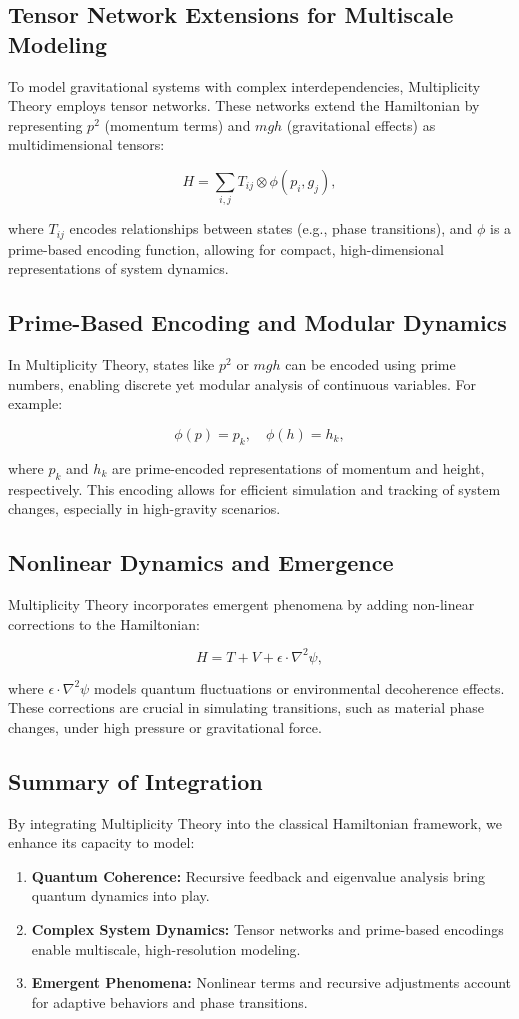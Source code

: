 \documentclass{article}
\theoremstyle{plain}
\begin{document}
\subsection{Tensor Network Extensions for Multiscale Modeling}
To model gravitational systems with complex interdependencies, Multiplicity Theory employs tensor networks. These networks extend the Hamiltonian by representing \( p^2 \) (momentum terms) and \( mgh \) (gravitational effects) as multidimensional tensors:

\[
H = \sum_{i,j} T_{ij} \otimes \phi(p_i, g_j),
\]

where \( T_{ij} \) encodes relationships between states (e.g., phase transitions), and \( \phi \) is a prime-based encoding function, allowing for compact, high-dimensional representations of system dynamics.

\subsection{Prime-Based Encoding and Modular Dynamics}
In Multiplicity Theory, states like \( p^2 \) or \( mgh \) can be encoded using prime numbers, enabling discrete yet modular analysis of continuous variables. For example:

\[
\phi(p) = p_k, \quad \phi(h) = h_k,
\]

where \( p_k \) and \( h_k \) are prime-encoded representations of momentum and height, respectively. This encoding allows for efficient simulation and tracking of system changes, especially in high-gravity scenarios.

\subsection{Nonlinear Dynamics and Emergence}
Multiplicity Theory incorporates emergent phenomena by adding non-linear corrections to the Hamiltonian:

\[
H = T + V + \epsilon \cdot \nabla^2 \psi,
\]

where \( \epsilon \cdot \nabla^2 \psi \) models quantum fluctuations or environmental decoherence effects. These corrections are crucial in simulating transitions, such as material phase changes, under high pressure or gravitational force.

\subsection{Summary of Integration}
By integrating Multiplicity Theory into the classical Hamiltonian framework, we enhance its capacity to model:
\begin{enumerate}
    \item \textbf{Quantum Coherence:} Recursive feedback and eigenvalue analysis bring quantum dynamics into play.
    \item \textbf{Complex System Dynamics:} Tensor networks and prime-based encodings enable multiscale, high-resolution modeling.
    \item \textbf{Emergent Phenomena:} Nonlinear terms and recursive adjustments account for adaptive behaviors and phase transitions.
\end{enumerate}
\end{document}
